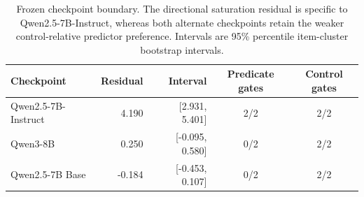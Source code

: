 \begin{table}[H]
\centering
\small
\begin{tabular}{lrrcc}
\toprule
Checkpoint & Residual & Interval & Predicate gates & Control gates \\
\midrule
Qwen2.5-7B-Instruct & 4.190 & [2.931, 5.401] & 2/2 & 2/2 \\
Qwen3-8B & 0.250 & [-0.095, 0.580] & 0/2 & 2/2 \\
Qwen2.5-7B Base & -0.184 & [-0.453, 0.107] & 0/2 & 2/2 \\
\bottomrule
\end{tabular}
\caption{Frozen checkpoint boundary. The directional saturation residual is specific to Qwen2.5-7B-Instruct, whereas both alternate checkpoints retain the weaker control-relative predictor preference. Intervals are 95\% percentile item-cluster bootstrap intervals.}
\label{tab:main-checkpoint-boundary}
\end{table}
